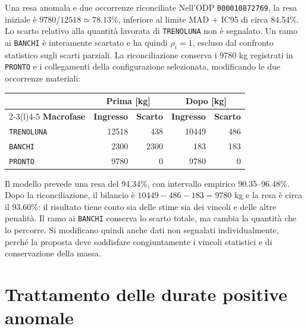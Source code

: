 \begingroup
{}
\begin{examplebox}{Una resa anomala e due occorrenze riconciliate}
Nell'ODP \texttt{000010872769}, la resa iniziale è $\num{9780}/\num{12518}\simeq\num{78.13}\%$, inferiore al limite MAD + IC95 di circa \num{84.54}\%. Lo scarto relativo alla quantità lavorata di \texttt{TRENOLUNA} non è segnalato. Un ramo ai \texttt{BANCHI} è interamente scartato e ha quindi $\rho_i=1$, escluso dal confronto statistico sugli scarti parziali. La riconciliazione conserva i \num{9780} kg registrati in \texttt{PRONTO} e i collegamenti della configurazione selezionata, modificando le due occorrenze materiali:

\begin{center}
\small
\begin{tabular}{@{}lrrrr@{}}
\toprule
& \multicolumn{2}{c}{\textbf{Prima [kg]}} & \multicolumn{2}{c}{\textbf{Dopo [kg]}}\\
\cmidrule(lr){2-3}\cmidrule(l){4-5}
\textbf{Macrofase} & \textbf{Ingresso} & \textbf{Scarto} & \textbf{Ingresso} & \textbf{Scarto}\\
\midrule
\texttt{TRENOLUNA} & \num{12518} & 438 & \num{10449} & 486\\
\texttt{BANCHI} & \num{2300} & \num{2300} & 183 & 183\\
\texttt{PRONTO} & \num{9780} & 0 & \num{9780} & 0\\
\bottomrule
\end{tabular}
\end{center}

Il modello prevede una resa del \num{94.34}\%, con intervallo empirico \num{90.35}--\num{96.48}\%. Dopo la riconciliazione, il bilancio è $\num{10449}-486-183=\num{9780}$ kg e la resa è circa il \num{93.60}\%: il risultato tiene conto sia delle stime sia dei vincoli e delle altre penalità. Il ramo ai \texttt{BANCHI} conserva lo scarto totale, ma cambia la quantità che lo percorre. Si modificano quindi anche dati non segnalati individualmente, perché la proposta deve soddisfare congiuntamente i vincoli statistici e di conservazione della massa.
\end{examplebox}
\endgroup

\section{Trattamento delle durate positive anomale}
\label{sec:positive-duration-treatment}

